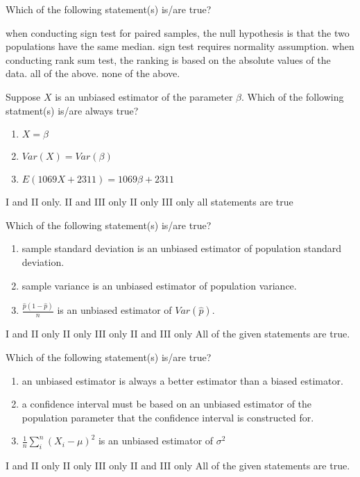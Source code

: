 \documentclass[letterpaper,10pt,addpoints]{exam}
\begin{document}
\begin{questions}
\question Which of the following statement(s) is/are true?
\begin{choices}
  \choice when conducting sign test for paired samples, the null hypothesis is that the two populations have the same median.
  \choice sign test requires normality assumption.
  \choice when conducting rank sum test, the ranking is based on the absolute values of the data.
  \choice all of the above.
  \correctchoice none of the above.
\end{choices}


\question Suppose $X$ is an unbiased estimator of the parameter $\beta$. Which of the following statment(s) is/are always true?
\begin{enumerate}[I]
  \item $X = \beta$
  \item $Var(X) = Var(\beta)$
  \item $E(1069X+2311) = 1069\beta+2311$
\end{enumerate}
\begin{choices}
  \choice I and II only.
  \choice II and III only
  \choice II only
  \correctchoice III only
  \choice all statements are true
  \end{choices}


\question Which of the following statement(s) is/are true?
\begin{enumerate}[I]
  \item sample standard deviation is an unbiased estimator of population standard deviation.
  \item sample variance is an unbiased estimator of population variance.
  \item $\frac{\hat{p}(1-\hat{p})}{n}$ is an unbiased estimator of $Var(\hat{p})$.
\end{enumerate}
\begin{choices}
  \choice I and II only
  \correctchoice II only
  \choice III only
  \choice II and III only
  \choice All of the given statements are true.
  \end{choices}

\question Which of the following statement(s) is/are true?
\begin{enumerate}[I]
  \item an unbiased estimator is always a better estimator than a biased estimator.
  \item a confidence interval must be based on an unbiased estimator of the population parameter that the confidence interval is constructed for.
  \item $\frac{1}{n}\sum_i^n(X_i - \mu)^2$ is an unbiased estimator of $\sigma^2$
\end{enumerate}
\begin{choices}
  \choice I and II only
  \choice II only
  \correctchoice III only
  \choice II and III only
  \choice All of the given statements are true.
  \end{choices}


\end{questions}
\end{document}
